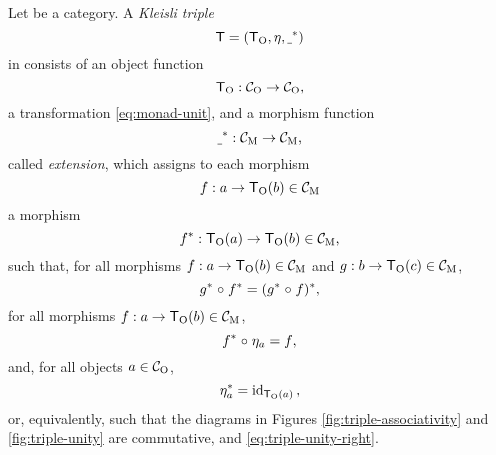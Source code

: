 \begin{definition}

  \label{def:triple}



  Let  be a category. A \emph{Kleisli triple}
  \begin{equation}
    \label{eq:triple}
    \mon{T} = (\funcO{T}, \nat{\eta}, \monM{T}{\underscore})
  \end{equation}
  in  consists of an object function
  \begin{equation}
    \label{eq:triple-}
    \funcO{T}: \catO{C} \to \catO{C}
    \text{,}
  \end{equation}
  a transformation \nat{\eta} \eqref{eq:monad-unit}, and a morphism
  function
  \begin{equation}
    \label{eq:triple-extension}
    \monM{T}{\underscore}: \catM{C} \to \catM{C}
    \text{,}
  \end{equation}
  called \emph{extension}, which assigns to each morphism
  \begin{equation*}
    f: a \to \funcO{T}(b) \in \catM{C}
  \end{equation*}
  a morphism
  \begin{equation*}
    \monM{T}{f}: \funcO{T}(a) \to \funcO{T}(b) \in \catM{C}
    \text{,}
  \end{equation*}
  such that, for all morphisms $f: a \to \funcO{T}(b) \in \catM{C}$
  and $g: b \to \funcO{T}(c) \in \catM{C}$,
  \begin{equation}
    \label{eq:triple-associativity}
    \monM{T}{g} \comp \monM{T}{f} = \monM{T}{(\monM{T}{g} \comp f)}
    \text{,}
  \end{equation}
  for all morphisms $f: a \to \funcO{T}(b) \in \catM{C}$,
  \begin{equation}
    \label{eq:triple-unity-left}
    \monM{T}{f} \comp \natO{\eta}{a} = f
    \text{,}
  \end{equation}
  and, for all objects $a \in \catO{C}$,
  \begin{equation}
    \label{eq:triple-unity-right}
    \monM{T}{\natO{\eta}{a}} = \idO{\funcO{T}(a)}
    \text{,}
  \end{equation}
  or, equivalently, such that the diagrams in Figures
  \ref{fig:triple-associativity} and \ref{fig:triple-unity} are
  commutative, and \eqref{eq:triple-unity-right}.
  \begin{figure}[htb]
    \begin{subfigure}[b]{0.5\linewidth}
      \begin{center}
\end{center}
\end{subfigure}
\end{figure}
\end{definition}
